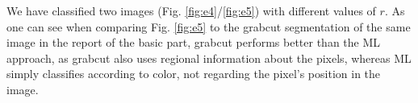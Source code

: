\documentclass[11pt,a4paper]{article}
\begin{document}
We have classified two images (Fig. \ref{fig:e4}/\ref{fig:e5}) with different values of $r$. As one can see when comparing Fig. \ref{fig:e5} to the grabcut segmentation of the same image in the report of the basic part, grabcut performs better than the ML approach, as grabcut also uses regional information about the pixels, whereas ML simply classifies according to color, not regarding the pixel's position in the image.

\begin{figure}
\centering
{}
\quad
{}
\quad

\end{figure}
\end{document}
